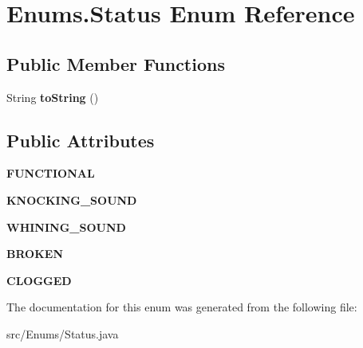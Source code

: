 \hypertarget{enumEnums_1_1Status}{}\section{Enums.\+Status Enum Reference}
\label{enumEnums_1_1Status}
\subsection*{Public Member Functions}
\begin{DoxyCompactItemize}
\item 
\hypertarget{enumEnums_1_1Status_a81a39c332235bd2b8812e191ecabbbcf}{}String {\bfseries to\+String} ()\label{enumEnums_1_1Status_a81a39c332235bd2b8812e191ecabbbcf}

\end{DoxyCompactItemize}
\subsection*{Public Attributes}
\begin{DoxyCompactItemize}
\item 
\hypertarget{enumEnums_1_1Status_a5fa6a4e1ff5360295848cf0bc73e7f42}{}{\bfseries F\+U\+N\+C\+T\+I\+O\+N\+A\+L}\label{enumEnums_1_1Status_a5fa6a4e1ff5360295848cf0bc73e7f42}

\item 
\hypertarget{enumEnums_1_1Status_aecedef8c4559718a67d0c9c39cb7b968}{}{\bfseries K\+N\+O\+C\+K\+I\+N\+G\+\_\+\+S\+O\+U\+N\+D}\label{enumEnums_1_1Status_aecedef8c4559718a67d0c9c39cb7b968}

\item 
\hypertarget{enumEnums_1_1Status_ae07a3f58c3d32dfcb353ed32c8c91ef6}{}{\bfseries W\+H\+I\+N\+I\+N\+G\+\_\+\+S\+O\+U\+N\+D}\label{enumEnums_1_1Status_ae07a3f58c3d32dfcb353ed32c8c91ef6}

\item 
\hypertarget{enumEnums_1_1Status_aaeb89a837ae8eb34b8dbf6733668fda8}{}{\bfseries B\+R\+O\+K\+E\+N}\label{enumEnums_1_1Status_aaeb89a837ae8eb34b8dbf6733668fda8}

\item 
\hypertarget{enumEnums_1_1Status_a5ce7916da9e59cdc5392ad23bed2ff3d}{}{\bfseries C\+L\+O\+G\+G\+E\+D}\label{enumEnums_1_1Status_a5ce7916da9e59cdc5392ad23bed2ff3d}

\end{DoxyCompactItemize}


The documentation for this enum was generated from the following file\+:\begin{DoxyCompactItemize}
\item 
src/\+Enums/Status.\+java\end{DoxyCompactItemize}
